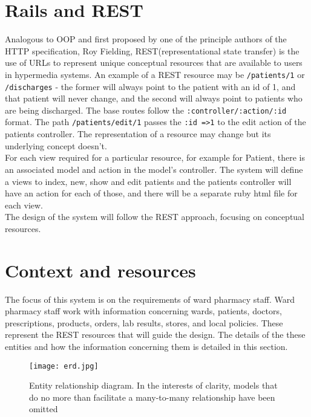 \documentclass[letterpaper]{amsart}
\begin{document}
\section{Rails and REST}
Analogous to OOP and first proposed by one of the principle authors of the HTTP specification, Roy Fielding\cite{refac}, REST(representational state transfer) is the use of URLs to represent unique conceptual resources that are available to users in hypermedia systems.    An example of a REST resource may be \texttt{/patients/1} or \texttt{/discharges} - the former will always point to the patient with an id of 1, and that patient will never change, and the second will always point to patients who are being discharged.  The base routes follow the \texttt{:controller/:action/:id} format. The path \texttt{/patients/edit/1} passes the \texttt{:id =>1} to the edit action of the patients controller.  The representation of a resource may change but its underlying concept doesn't. \\
For each view required for a particular resource, for example for Patient, there is an associated model and action in the model's controller.  The system will define a views to index, new, show and edit patients and the patients controller will have an action for each of those, and there will be a separate ruby html file for each view.\\
The design of the system will follow the REST approach, focusing on conceptual resources.  
\section{Context and resources} 
The focus of this system is on the requirements of ward pharmacy staff.  Ward pharmacy staff work with information concerning wards, patients, doctors, prescriptions, products, orders, lab results, stores, and local policies.  These represent the REST resources that will guide the design.  The details of the these entities and how the information concerning them is detailed in this section.
\begin{figure}[]
    \centering
    \texttt{[image: erd.jpg]}
    \caption{Entity relationship diagram.  In the interests of clarity, models that do no more than facilitate a many-to-many relationship have been omitted}
    \label{fig 1}
\end{figure}
\end{document}
